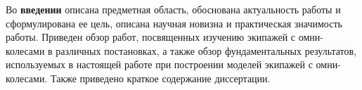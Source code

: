 
Во \textbf{введении} описана предметная область, обоснована актуальность работы и сформулирована ее цель, описана научная новизна и практическая значимость работы. Приведен обзор работ, посвященных изучению экипажей с омни-колесами в различных постановках, а также обзор фундаментальных результатов, используемых в настоящей работе при построении моделей экипажей с омни-колесами. Также приведено краткое содержание диссертации.